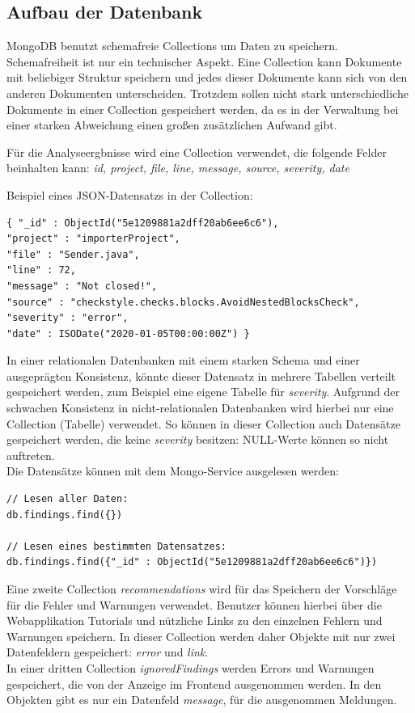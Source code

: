 \subsection{Aufbau der Datenbank}
MongoDB benutzt schemafreie Collections um Daten zu speichern. Schemafreiheit ist nur ein technischer Aspekt. Eine Collection kann Dokumente mit beliebiger Struktur speichern und jedes dieser Dokumente kann sich von den anderen Dokumenten unterscheiden. Trotzdem sollen nicht stark unterschiedliche Dokumente in einer Collection gespeichert werden, da es in der Verwaltung bei einer starken Abweichung einen großen zusätzlichen Aufwand gibt. 

Für die Analyseergbnisse wird eine Collection verwendet, die folgende Felder beinhalten kann: \textit{id, project, file, line, message, source, severity, date}

Beispiel eines JSON-Datensatzs in der Collection:

\begin{verbatim}
{ "_id" : ObjectId("5e1209881a2dff20ab6ee6c6"), 
"project" : "importerProject", 
"file" : "Sender.java", 
"line" : 72, 
"message" : "Not closed!", 
"source" : "checkstyle.checks.blocks.AvoidNestedBlocksCheck", 
"severity" : "error", 
"date" : ISODate("2020-01-05T00:00:00Z") }
\end{verbatim}

In einer relationalen Datenbanken mit einem starken Schema und einer ausgeprägten Konsistenz, könnte dieser Datensatz in mehrere Tabellen verteilt gespeichert werden, zum Beispiel eine eigene Tabelle für \textit{severity}. Aufgrund der schwachen Konsistenz in nicht-relationalen Datenbanken wird hierbei nur eine Collection (Tabelle) verwendet. So können in dieser Collection auch Datensätze gespeichert werden, die keine \textit{severity} besitzen: NULL-Werte können so nicht auftreten. \\
Die Datensätze können mit dem Mongo-Service ausgelesen werden: 

\begin{verbatim}
// Lesen aller Daten:
db.findings.find({})

// Lesen eines bestimmten Datensatzes:
db.findings.find({"_id" : ObjectId("5e1209881a2dff20ab6ee6c6")})
\end{verbatim}

Eine zweite Collection \textit{recommendations} wird für das Speichern der Vorschläge für die Fehler und Warnungen verwendet. Benutzer können hierbei über die Webapplikation Tutorials und nützliche Links zu den einzelnen Fehlern und Warnungen speichern.
In dieser Collection werden daher Objekte mit nur zwei Datenfeldern gespeichert: \textit{error} und \textit{link}. \\
In einer dritten Collection \textit{ignoredFindings} werden Errors und Warnungen gespeichert, die von der Anzeige im Frontend ausgenommen werden. In den Objekten gibt es nur ein Datenfeld \textit{message}, für die ausgenommen Meldungen.
